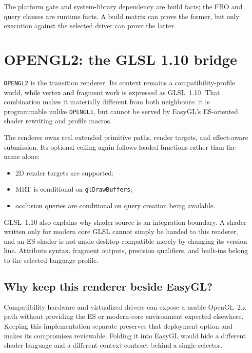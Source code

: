 \begin{sourcenote}
The platform gate and system-library dependency are build facts; the FBO and query clauses
are runtime facts.  A build matrix can prove the former, but only execution against the
selected driver can prove the latter.
\end{sourcenote}

\section{OPENGL2: the GLSL 1.10 bridge}

\texttt{OPENGL2} is the transition renderer.  Its context remains a compatibility-profile
world, while vertex and fragment work is expressed as GLSL~1.10.  That combination makes it
materially different from both neighbours: it is programmable unlike \texttt{OPENGL1}, but
cannot be served by EasyGL's ES-oriented shader rewriting and profile macros.

The renderer owns real extended primitive paths, render targets, and effect-aware submission.
Its optional ceiling again follows loaded functions rather than the name alone:

\begin{itemize}
  \item 2D render targets are supported;
  \item MRT is conditional on \texttt{glDrawBuffers};
  \item occlusion queries are conditional on query creation being available.
\end{itemize}

GLSL~1.10 also explains why shader source is an integration boundary.  A shader written only
for modern core GLSL cannot simply be handed to this renderer, and an ES shader is not made
desktop-compatible merely by changing its version line.  Attribute syntax, fragment outputs,
precision qualifiers, and built-ins belong to the selected language profile.

\subsection{Why keep this renderer beside EasyGL?}

Compatibility hardware and virtualized drivers can expose a usable OpenGL~2.x path without
providing the ES or modern-core environment expected elsewhere.  Keeping this implementation
separate preserves that deployment option and makes its compromises reviewable.  Folding it
into EasyGL would hide a different shader language and a different context contract behind a
single selector.

